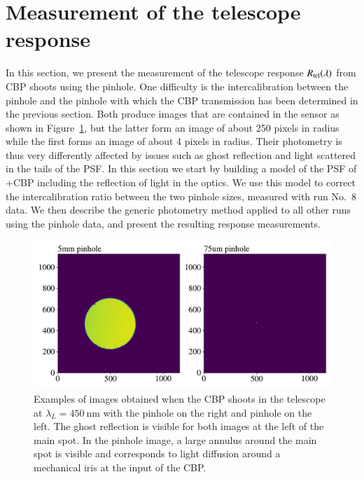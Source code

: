 \section{Measurement of the \SD telescope response}
\label{sec:rsd}
\label{sec:sd_datadesc}

In this section, we present the measurement of the \SD telescope response $R_{\mathrm{tel}}(\lambda)$ from CBP shoots using the \spinhole pinhole. One difficulty is the intercalibration between the \spinhole pinhole and the \bpinhole pinhole with which the CBP transmission has been determined in the previous section. Both produce images that are contained in the \SD sensor as shown in Figure~\ref{fig:ccd_examples}, but the latter form an image of about 250 pixels in radius while the first forms an image of about 4 pixels in radius. Their photometry is thus very differently affected by issues such as ghost reflection and light scattered in the tails of the PSF. In this section we start by building a model of the PSF of \SD+CBP  including the reflection of light in the optics. We use this model to correct the intercalibration ratio between the two pinhole sizes, measured with run No.~8 data. We then describe the generic photometry method applied to all other runs using the \spinhole pinhole data, and present the resulting response measurements.   

\begin{figure}[h]
    \centering
    \includegraphics[width=\columnwidth]{fig/ccd_examples.pdf}
    \caption{Examples of images obtained when the CBP shoots in the \SD telescope at $\lambda_L=\SI{450}{\nm}$ with the \bpinhole pinhole on the right and \spinhole pinhole on the left. The ghost reflection is visible for both images at the left of the main spot. In the \bpinhole pinhole image, a large annulus around the main spot is visible and corresponds to light diffusion around a mechanical iris at the input of the CBP.}
    \label{fig:ccd_examples}
\end{figure}


